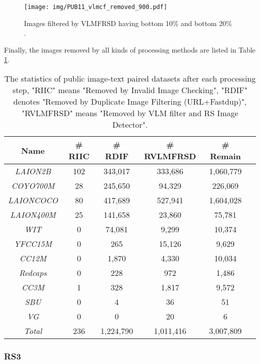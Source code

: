 \documentclass[journal]{IEEEtran}
\begin{document}
\begin{figure}[htbp]
    \centering
    \texttt{[image: img/PUB11\_vlmcf\_removed\_900.pdf]}
    \caption{Images filtered by VLMFRSD having bottom 10\%  and bottom 20\% .}
    \label{fig:pub11_vlmcf_removed_900}
\end{figure}



Finally, the images removed by all kinds of processing methods are listed in Table \ref{table:pubdataset_step_stat}.

\begin{table}[H]
\caption{The statistics of public image-text paired datasets after each processing step, "RIIC" means "Removed by Invalid Image Checking", "RDIF" denotes "Removed by Duplicate Image Filtering (URL+Fastdup)", "RVLMFRSD" means "Removed by VLM filter and RS Image Detector".}
\label{table:pubdataset_step_stat}
\centering {} 
\begin{tabular}{|c|c|c|c|c|c|}\hline
Name & \# RIIC & \# RDIF  & \# RVLMFRSD & \# Remain \\\hline
\textit{LAION2B} & 102 & 343,017 & 333,686 & 1,060,779\\
\textit{COYO700M} & 28 & 245,650& 94,329  & 226,069 \\
\textit{LAIONCOCO} & 80 & 417,689& 527,941 & 1,604,028  \\
\textit{LAION400M} & 25 & 141,658 & 23,860 & 75,781 \\
\textit{WIT} & 0 & 74,081 & 9,299 & 10,374  \\
\textit{YFCC15M} & 0 & 265 & 15,126 & 9,629\\
\textit{CC12M} & 0 & 1,870 & 4,330 & 10,034\\
\textit{Redcaps} & 0 & 228 & 972 & 1,486\\
\textit{CC3M} & 1 & 328 & 1,817 & 9,572\\
\textit{SBU} & 0 & 4 & 36 & 51 \\
\textit{VG} & 0 & 0 & 20 & 6\\
\textit{Total} & 236 & 1,224,790 & 1,011,416 & 3,007,809 \\ \hline
\end{tabular}
\end{table}




\subsubsection{RS3}
\label{appendix:RS3}
\end{document}
